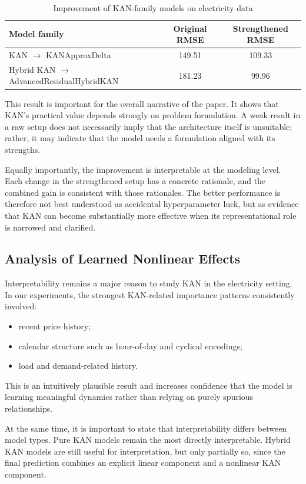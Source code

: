 \documentclass[10pt,conference,onecolumn]{IEEEtran}
\begin{document}
\begin{table}[t]
\centering
\caption{Improvement of KAN-family models on electricity data}
\label{tab:improvement}
\small
\begin{tabular}{lcc}
\toprule
Model family & Original RMSE & Strengthened RMSE \\
\midrule
KAN $\rightarrow$ KANApproxDelta & 149.51 & 109.33 \\
Hybrid KAN $\rightarrow$ AdvancedResidualHybridKAN & 181.23 & 99.96 \\
\bottomrule
\end{tabular}
\end{table}

This result is important for the overall narrative of the paper. It shows that KAN's practical value depends strongly on problem formulation. A weak result in a raw setup does not necessarily imply that the architecture itself is unsuitable; rather, it may indicate that the model needs a formulation aligned with its strengths.

Equally importantly, the improvement is interpretable at the modeling level. Each change in the strengthened setup has a concrete rationale, and the combined gain is consistent with those rationales. The better performance is therefore not best understood as accidental hyperparameter luck, but as evidence that KAN can become substantially more effective when its representational role is narrowed and clarified.

\subsection{Analysis of Learned Nonlinear Effects}

Interpretability remains a major reason to study KAN in the electricity setting. In our experiments, the strongest KAN-related importance patterns consistently involved:
\begin{itemize}
    \item recent price history;
    \item calendar structure such as hour-of-day and cyclical encodings;
    \item load and demand-related history.
\end{itemize}

This is an intuitively plausible result and increases confidence that the model is learning meaningful dynamics rather than relying on purely spurious relationships.

At the same time, it is important to state that interpretability differs between model types. Pure KAN models remain the most directly interpretable. Hybrid KAN models are still useful for interpretation, but only partially so, since the final prediction combines an explicit linear component and a nonlinear KAN component.
\end{document}
